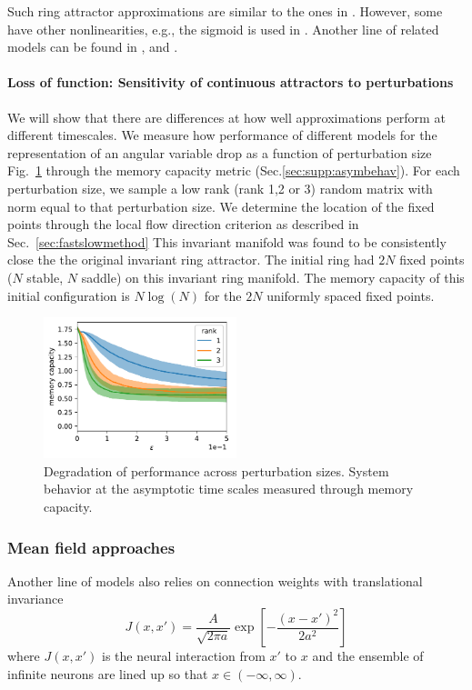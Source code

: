 \documentclass{article} %
\newcounter{ct}
\theoremstyle{definition}
\theoremstyle{remark}
\begin{document}
 Such ring attractor approximations are similar to the ones in \citep{goodridge2000,samsonovich1997path,redish1996coupled, tsodyks1995associative}. %
However, some have other nonlinearities, e.g.,  the sigmoid is used in \citep{goodridge2000}.
Another line of related models can be found in \citep{Burak2009}, \citep{couey2013} and \citep{spalla2021continuous}.



\paragraph{Loss of function: Sensitivity of continuous attractors to perturbations}\label{sec:supp:boa}
We will show that there are differences at how well approximations perform at different timescales.
We measure how performance of different models for the representation of an angular variable drop as a function of perturbation size Fig.~\ref{fig:performance} through the memory capacity metric (Sec.\ref{sec:supp:asymbehav}).
For each perturbation size, we sample a low rank (rank 1,2 or 3) random matrix with norm equal to that perturbation size.
We determine the location of the fixed points through the local flow direction criterion as described in Sec.~\ref{sec:fastslowmethod}
This invariant manifold was found to be consistently close the the original invariant ring attractor.
The initial ring had \(2N\) fixed points (\(N\) stable, \(N\) saddle) on this invariant ring manifold.
The memory capacity of this initial configuration is \(N\log(N)\) for the \(2N\) uniformly spaced fixed points.

\begin{figure}[tbhp]
  \centering
  \includegraphics[width=0.5\textwidth]{performance2}
  \caption{Degradation of performance across perturbation sizes. System behavior at the asymptotic time scales measured through memory capacity. }\label{fig:performance}
\end{figure}



\subsubsection{Mean field approaches}
Another line of models	\citep{miller2006analysis,wu2008dynamics,fung2010,wu2016ca} also relies on connection weights with translational invariance
\begin{equation}
J(x, x') = \frac{A}{\sqrt{2\pi a}} \exp\left[ -\frac{(x - x')^2}{2a^2} \right]
\end{equation}
where \(J (x, x')\) is the neural interaction from \(x'\) to \(x\) and the ensemble of infinite neurons are lined up so that \(x\in (-\infty, \infty)\).
\end{document}
